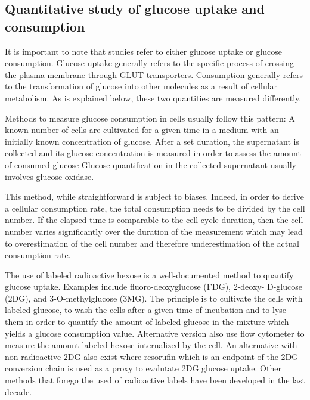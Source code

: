 \documentclass[11pt,a4paper]{article}
\begin{document}
 
\subsection{Quantitative study of glucose uptake and consumption}
It is important to note that studies refer to either glucose uptake or glucose consumption. Glucose uptake generally refers to the specific process of crossing the plasma membrane through GLUT transporters. Consumption  generally refers to the transformation of glucose into other molecules as a result of cellular metabolism. As is explained below, these two quantities are measured differently.\cite{WangK2023}

Methods to measure glucose consumption in cells usually follow this pattern: A known number of cells are cultivated for a given time in a medium with an initially known concentration of glucose. After a set duration, the supernatant is collected and its glucose concentration is measured in order to assess the amount of consumed glucose\cite{Mazurek1997}\cite{Bayar2021} Glucose quantification in the collected supernatant usually involves glucose oxidase.\cite{Prado-Garcia2020}

This method, while straightforward is subject to biases. Indeed, in order to derive a cellular consumption rate, the total consumption needs to be divided by the cell number. If the elapsed time is comparable to the cell cycle duration, then the cell number varies significantly over the duration of the measurement which may lead to overestimation of the cell number and therefore underestimation of the actual consumption rate. 

The use of labeled radioactive hexose is a well-documented method to quantify glucose uptake. Examples include fluoro-deoxyglucose (FDG), 2-deoxy- D-glucose (2DG), and 3-O-methylglucose (3MG).\cite{Yamamoto2011} The principle is to cultivate the cells with labeled glucose, to wash the cells after a given time of incubation and to lyse them in order to quantify the amount of labeled glucose in the mixture which yields a glucose consumption value. Alternative version also use flow cytometer to measure the amount labeled hexose internalized by the cell.\cite{Jiao2019} An alternative with non-radioactive 2DG also exist where resorufin which is an endpoint of the 2DG conversion chain is used as a proxy to evalutate 2DG glucose uptake.\cite{Yamamoto2011} Other methods that forego the used of radioactive labels have been developed in the last decade.\cite{Yan2016}
\end{document}
